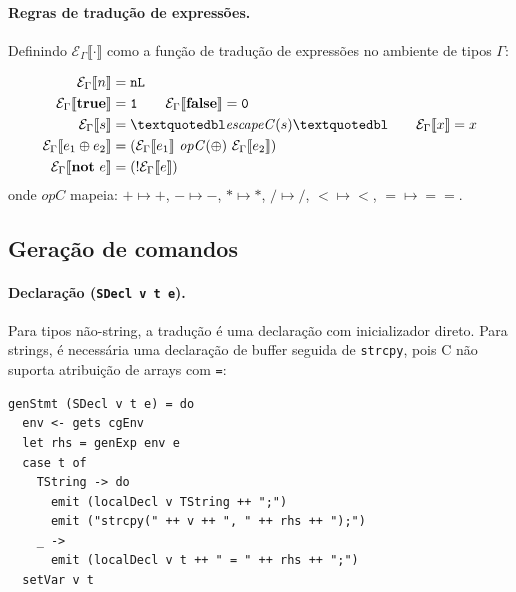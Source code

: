 \paragraph{Regras de tradução de expressões.}

Definindo $\mathcal{E}_\Gamma\llbracket \cdot \rrbracket$ como a função de
tradução de expressões no ambiente de tipos $\Gamma$:

\begin{Definition}\label{def:tline-exp}
\begin{align*}
\mathcal{E}_\Gamma\llbracket n \rrbracket &= \mathtt{nL} \\
\mathcal{E}_\Gamma\llbracket \mathbf{true} \rrbracket &= \mathtt{1} \qquad
\mathcal{E}_\Gamma\llbracket \mathbf{false} \rrbracket = \mathtt{0} \\
\mathcal{E}_\Gamma\llbracket s \rrbracket &= \mathtt{\textquotedbl}\mathit{escapeC}(s)\mathtt{\textquotedbl} \qquad
\mathcal{E}_\Gamma\llbracket x \rrbracket = x \\
\mathcal{E}_\Gamma\llbracket e_1 \oplus e_2 \rrbracket
  &= \mathtt{(}\mathcal{E}_\Gamma\llbracket e_1 \rrbracket\ \mathit{opC}(\oplus)\ \mathcal{E}_\Gamma\llbracket e_2 \rrbracket\mathtt{)} \\
\mathcal{E}_\Gamma\llbracket \mathbf{not}\ e \rrbracket
  &= \mathtt{(!}\mathcal{E}_\Gamma\llbracket e \rrbracket\mathtt{)}
\end{align*}
onde $\mathit{opC}$ mapeia: $+{\mapsto}\mathtt{+}$,
$-{\mapsto}\mathtt{-}$, $*{\mapsto}\mathtt{*}$,
$/{}\mapsto\mathtt{/}$, $<{\mapsto}\mathtt{<}$,
$={\mapsto}\mathtt{==}$.
\end{Definition}

\subsection{Geração de comandos}

\paragraph{Declaração (\texttt{SDecl v t e}).}
Para tipos não-string, a tradução é uma declaração com inicializador direto.
Para strings, é necessária uma declaração de buffer seguida de
\texttt{strcpy}, pois C não suporta atribuição de arrays com \texttt{=}:

\begin{verbatim}
genStmt (SDecl v t e) = do
  env <- gets cgEnv
  let rhs = genExp env e
  case t of
    TString -> do
      emit (localDecl v TString ++ ";")
      emit ("strcpy(" ++ v ++ ", " ++ rhs ++ ");")
    _ ->
      emit (localDecl v t ++ " = " ++ rhs ++ ";")
  setVar v t
\end{verbatim}

